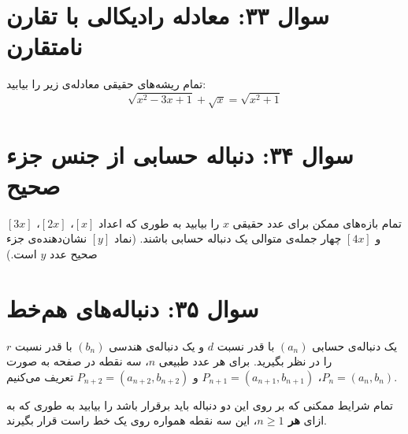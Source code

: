 \documentclass[12pt]{article}
\begin{document}
	\section*{سوال ۳۳: معادله رادیکالی با تقارن نامتقارن}
	تمام ریشه‌های حقیقی معادله‌ی زیر را بیابید:
	\begin{displaymath}
		\sqrt{x^2 - 3x + 1} + \sqrt{x} = \sqrt{x^2 + 1}
	\end{displaymath}
	
	\vspace{1cm}
	\hrulefill
	\vspace{1cm}
	
	\section*{سوال ۳۴: دنباله حسابی از جنس جزء صحیح}
	تمام بازه‌های ممکن برای عدد حقیقی \(x\) را بیابید به طوری که اعداد \([x]\)، \([2x]\)، \([3x]\) و \([4x]\) چهار جمله‌ی متوالی یک دنباله حسابی باشند. (نماد \([y]\) نشان‌دهنده‌ی جزء صحیح عدد \(y\) است.)
	
	\vspace{1cm}
	\hrulefill
	\vspace{1cm}
	
	\section*{سوال ۳۵: دنباله‌های هم‌خط }
	یک دنباله‌ی حسابی \( (a_n) \) با قدر نسبت \(d\) و یک دنباله‌ی هندسی \( (b_n) \) با قدر نسبت \(r\) را در نظر بگیرید. برای هر عدد طبیعی \(n\)، سه نقطه در صفحه به صورت \(P_n = (a_n, b_n)\)، \(P_{n+1} = (a_{n+1}, b_{n+1})\) و \(P_{n+2} = (a_{n+2}, b_{n+2})\) تعریف می‌کنیم.
	\vspace{0.5cm}
	
	تمام شرایط ممکنی که بر روی این دو دنباله باید برقرار باشد را بیابید به طوری که به ازای \textbf{هر \(n \ge 1\)}، این سه نقطه همواره روی یک خط راست قرار بگیرند.
	
	\vspace{1cm}
	\hrulefill
	\vspace{1cm}
	
\end{document}
